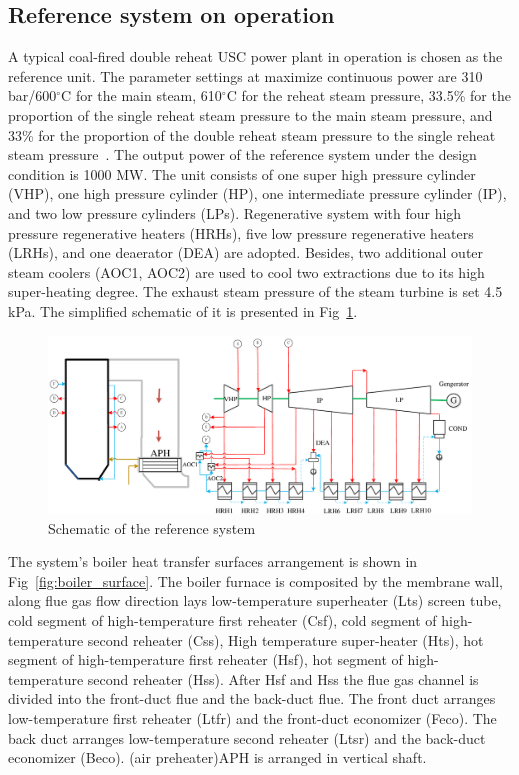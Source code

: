 \documentclass[preprint,12pt]{elsarticle}
\begin{document}
\subsection{Reference system on operation} %
\label{sub2:ref intro}
A typical coal-fired double reheat USC power plant in operation is chosen as the reference unit.
The parameter settings at maximize continuous power are 310\,bar/600$^\circ$C for the main steam, 610$^\circ$C for the reheat steam pressure, 33.5\% for the proportion of the single reheat steam pressure to the main steam pressure, and 33\% for the proportion of the double reheat steam pressure to the single reheat steam pressure~\cite{Zhao2017Exergy}.
The output power of the reference system under the design condition is 1000 MW.
The unit consists of one super high pressure cylinder (VHP), one high pressure cylinder (HP), one intermediate pressure cylinder (IP), and two low pressure cylinders (LPs).
Regenerative system with four high pressure regenerative heaters (HRHs), five low pressure regenerative heaters (LRHs), and one deaerator (DEA) are adopted.
Besides, two additional outer steam coolers (AOC1, AOC2) are used to cool two extractions due to its high super-heating degree. The exhaust steam pressure of the steam turbine is set 4.5\,kPa. The simplified schematic of it is presented in Fig~\ref{fig:reference_system}.

\begin{figure}[htbp]
\centering
\includegraphics[width=1\textwidth]{fig/reference_system}
\caption{Schematic of the reference system} 
\label{fig:reference_system}
\end{figure}
The system's boiler heat transfer surfaces arrangement is shown in Fig~\ref{fig:boiler_surface}. 
The boiler furnace is composited by the membrane wall, along flue gas flow direction lays low-temperature superheater (Lts) screen tube, cold segment of high-temperature first reheater (Csf), cold segment of high-temperature second reheater (Css), High temperature super-heater (Hts), hot segment of high-temperature first reheater (Hsf), hot segment of high-temperature second reheater (Hss).
After Hsf and Hss the flue gas channel is divided into the front-duct flue and the back-duct flue.
The front duct arranges low-temperature first reheater (Ltfr) and the front-duct economizer (Feco).
The back duct arranges low-temperature second reheater (Ltsr) and the back-duct economizer (Beco).
(air preheater)APH is arranged in vertical shaft.
\end{document}
